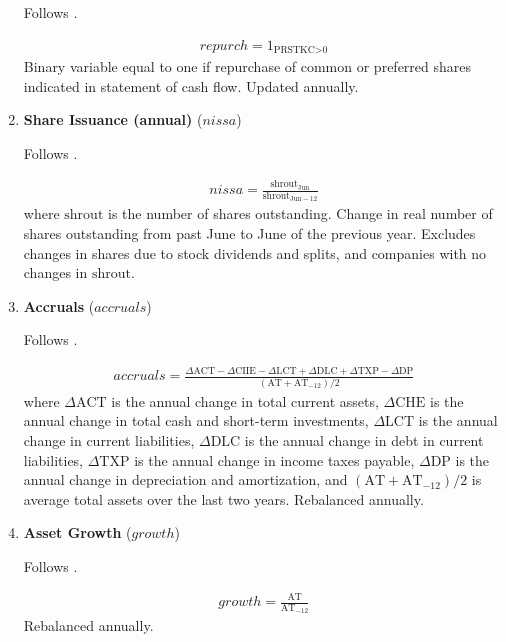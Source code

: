 \begin{enumerate}
	Follows . 
	
	\begin{align*}
		repurch = 1_{\text{PRSTKC>0}}
	\end{align*}
	Binary variable equal to one if repurchase of common or preferred shares indicated in statement of cash flow. Updated annually.
	
	
	
	\item \textbf{Share Issuance (annual)} ($nissa$)
	
	Follows . 
	
	\begin{align*}
		nissa = \frac{ \mathrm{shrout}_{\mathrm{Jun}} }{ \mathrm{shrout}_{\mathrm{Jun-12}} }
	\end{align*}	
	where $\mathrm{shrout}$ is the number of shares outstanding. Change in real number of shares outstanding from past June to June of the previous year. Excludes changes in shares due to stock dividends and splits, and companies with no changes in $\mathrm{shrout}$.
	
	
	
	\item \textbf{Accruals} ($accruals$) 
	
	Follows . 
	
	\begin{align*}
		accruals =\frac{\Delta \mathrm{ACT}-\Delta \mathrm{CIIE}-\Delta \mathrm{LCT}+\Delta \mathrm{DLC}+\Delta \mathrm{TXP}-\Delta \mathrm{DP}}{(\mathrm{AT}+\mathrm{AT}_{-12}) / 2}
	\end{align*}
	where $\Delta \mathrm{ACT}$ is the annual change in total current assets, $\Delta \mathrm{CHE}$ is the annual change in total cash and short-term investments, $\Delta \mathrm{LCT}$ is the annual change in current liabilities, $\Delta \mathrm{DLC}$ is the annual change in debt in current liabilities, $\Delta \mathrm{TXP}$ is the annual change in income taxes payable, $\Delta \mathrm{DP}$ is the annual change in depreciation and amortization, and $\left(\mathrm{AT}+\mathrm{AT}_{-12}\right) / 2$ is average total assets over the last two years. Rebalanced annually.
	
	
	
	\item \textbf{Asset Growth} ($growth$) 
	
	Follows . 
	
	\begin{align*}
		growth = \frac{ \mathrm{AT} }{ \mathrm{AT}_{-12} }
	\end{align*}	
	Rebalanced annually.
	

\end{enumerate}
